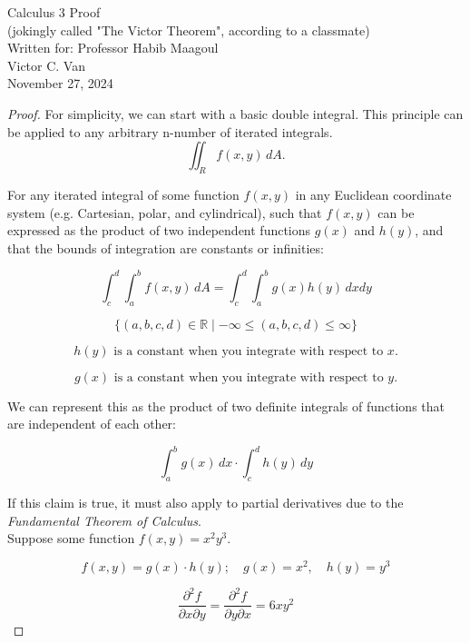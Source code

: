 \documentclass{article}
\begin{document}
\begin{titlepage}
    \centering
    \vspace*{\fill} %
    {\Large Calculus 3 Proof} \\[0.5cm]
    {\Large (jokingly called "The Victor Theorem", according to a classmate)} \\[0.5cm]
    {\Large Written for: Professor Habib Maagoul} \\[0.5cm]
    {\large Victor C. Van} \\[1cm]
    {\large November 27, 2024}
    \vspace*{\fill} %
\end{titlepage}

\begin{proof}

For simplicity, we can start with a basic double integral. This principle can be applied to any arbitrary n-number of iterated integrals.
\[
    \iint_Rf(x,y) \, dA.
\]

For any iterated integral of some function $f(x,y)$ in any Euclidean coordinate system (e.g. Cartesian, polar, and cylindrical), such that $f(x,y)$ can be expressed as the product of two independent functions $g(x)$ and $h(y)$, and that the bounds of integration are constants or infinities:

\[
    \int_{c}^{d} \int_{a}^{b} f(x, y) \, dA = \int_{c}^{d} \int_{a}^{b} g(x)h(y) \,dxdy
\]

\[
    \{(a, b, c, d) \in \mathbb{R} \mid - \infty \le (a, b, c, d) \le \infty \}
\]

\[
    h(y) \text{ is a constant when you integrate with respect to } x.
\]

\[
    g(x) \text{ is a constant when you integrate with respect to } y.
\]

We can represent this as the product of two definite integrals of functions that are independent of each other:

\[
\int_{a}^{b}g(x) \,dx \cdot \int_{c}^{d}h(y) \,dy
\]

If this claim is true, it must also apply to partial derivatives due to the \textit{Fundamental Theorem of Calculus}.\\

Suppose some function $f(x, y) = x^2 y^3$.

\[
    f(x, y) = g(x) \cdot h(y); \quad g(x) = x^2, \quad h(y) = y^3
\]

\[
    \frac{\partial^{2} f}{\partial x \partial y} = \frac{\partial^{2}f}{\partial y \partial x} = 6xy^{2}
\]


\end{proof}
\end{document}
